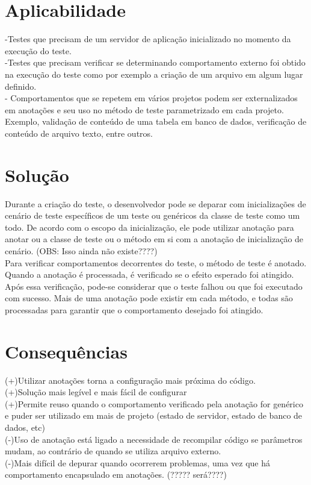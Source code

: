 \documentclass[12pt,a4paper,oneside]{book}
\begin{document}
\section{Aplicabilidade}
-Testes que precisam de um servidor de aplicação inicializado no momento da execução do teste.\\
-Testes que precisam verificar se determinando comportamento externo foi obtido na execução do teste como por exemplo a criação de um arquivo em algum lugar definido.\\
- Comportamentos que se repetem em vários projetos podem ser externalizados em anotações e seu uso no método de teste parametrizado em cada projeto. Exemplo, validação de conteúdo de uma tabela em banco de dados, verificação de conteúdo de arquivo texto, entre outros.\\

\section{Solução}
Durante a criação do teste, o desenvolvedor pode se deparar com inicializações de cenário de teste específicos de um teste ou genéricos da classe de teste como um todo. De acordo com o escopo da inicialização, ele pode utilizar anotação para anotar ou a classe de teste ou o método em si com a anotação de inicialização de cenário. (OBS: Isso ainda não existe????)\\
Para verificar comportamentos decorrentes do teste, o método de teste é anotado. Quando a anotação é processada, é verificado se o efeito esperado foi atingido. Após essa verificação, pode-se considerar que o teste falhou ou que foi executado com sucesso. Mais de uma anotação pode existir em cada método, e todas são processadas para garantir que o comportamento desejado foi atingido.

\section{Consequências}
(+)Utilizar anotações torna a configuração mais próxima do código.\\
(+)Solução mais legível e mais fácil de configurar\\
(+)Permite reuso quando o comportamento verificado pela anotação for genérico e puder ser utilizado em mais de projeto (estado de servidor, estado de banco de dados, etc)\\
(-)Uso de anotação está ligado a necessidade de recompilar código se parâmetros mudam, ao contrário de quando se utiliza arquivo externo.\\
(-)Mais difícil de depurar quando ocorrerem problemas, uma vez que há comportamento encapsulado em anotações. (????? será????)\\
\end{document}
